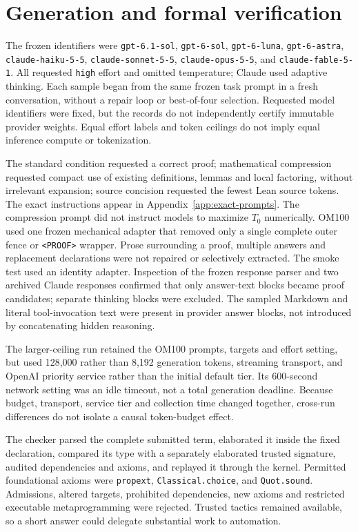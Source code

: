\section{Generation and formal verification}
\label{sec:methods-protocol}

The frozen identifiers were \texttt{gpt-6.1-sol}, \texttt{gpt-6-sol}, \texttt{gpt-6-luna}, \texttt{gpt-6-astra}, \texttt{claude-haiku-5-5}, \texttt{claude-sonnet-5-5}, \texttt{claude-opus-5-5}, and \texttt{claude-fable-5-1}. All requested \texttt{high} effort and omitted temperature; Claude used adaptive thinking. Each sample began from the same frozen task prompt in a fresh conversation, without a repair loop or best-of-four selection. Requested model identifiers were fixed, but the records do not independently certify immutable provider weights. Equal effort labels and token ceilings do not imply equal inference compute or tokenization.

The standard condition requested a correct proof; mathematical compression requested compact use of existing definitions, lemmas and local factoring, without irrelevant expansion; source concision requested the fewest Lean source tokens. The exact instructions appear in Appendix~\ref{app:exact-prompts}. The compression prompt did not instruct models to maximize $T_0$ numerically. OM100 used one frozen mechanical adapter that removed only a single complete outer fence or \texttt{<PROOF>} wrapper. Prose surrounding a proof, multiple answers and replacement declarations were not repaired or selectively extracted. The smoke test used an identity adapter. Inspection of the frozen response parser and two archived Claude responses confirmed that only answer-text blocks became proof candidates; separate thinking blocks were excluded. The sampled Markdown and literal tool-invocation text were present in provider answer blocks, not introduced by concatenating hidden reasoning.

The larger-ceiling run retained the OM100 prompts, targets and effort setting, but used 128,000 rather than 8,192 generation tokens, streaming transport, and OpenAI priority service rather than the initial default tier. Its 600-second network setting was an idle timeout, not a total generation deadline. Because budget, transport, service tier and collection time changed together, cross-run differences do not isolate a causal token-budget effect.

The checker parsed the complete submitted term, elaborated it inside the fixed declaration, compared its type with a separately elaborated trusted signature, audited dependencies and axioms, and replayed it through the kernel. Permitted foundational axioms were \texttt{propext}, \texttt{Classical.choice}, and \texttt{Quot.sound}. Admissions, altered targets, prohibited dependencies, new axioms and restricted executable metaprogramming were rejected. Trusted tactics remained available, so a short answer could delegate substantial work to automation.

